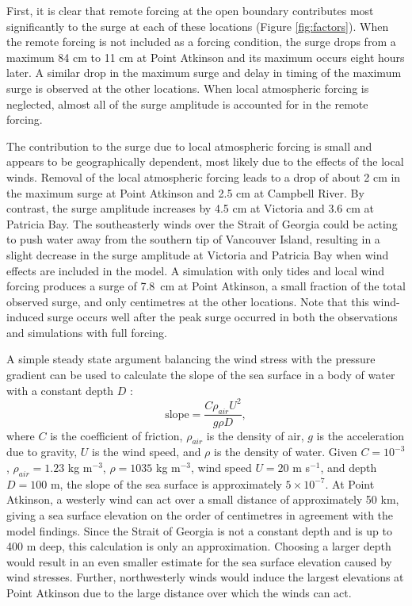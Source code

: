 \documentclass[letterpaper]{tATO2e}
\begin{document}
First, it is clear that remote forcing at the open boundary contributes most significantly to the surge at each of these locations (Figure \ref{fig:factors}). When the remote forcing is not included as a forcing condition, the surge drops from a maximum {\color{red}84 cm} to 11 cm at Point Atkinson and its maximum occurs eight hours later.  A similar drop in the maximum surge and delay in timing of the maximum surge is observed at the other locations.  When local atmospheric forcing is neglected, almost all of the surge amplitude is accounted for in the remote forcing.

The contribution to the surge due to local atmospheric forcing is small and appears to be geographically dependent, most likely due to the effects of the local winds. Removal of the local atmospheric forcing leads to a drop of about {\color{red}2 cm} in the maximum surge at Point Atkinson and {\color{red}2.5 cm} at Campbell River. By contrast, the surge amplitude increases by {\color{red} 4.5 cm} at Victoria and 3.6 cm at Patricia Bay. The southeasterly winds over the Strait of Georgia could be acting to push water away from the southern tip of Vancouver Island, resulting in a slight decrease in the surge amplitude at Victoria and Patricia Bay when wind effects are included in the model. A simulation with only tides and local wind forcing produces a surge of 7.8~cm at Point Atkinson, a small fraction of the total observed surge, and only centimetres at the other locations.  Note that this wind-induced surge occurs well after the peak surge occurred in both the observations and simulations with full forcing.

A simple steady state argument balancing the wind stress with the pressure gradient can be used to calculate the slope of the sea surface in a body of water with a constant depth $D$ \citep{pugh2004changing}: 
\begin{equation}
\text{slope} = \frac{C\rho_{air}U^2}{g\rho D},
\end{equation}
where $C$ is the coefficient of friction, $\rho_{air}$ is the density of air, $g$ is the acceleration due to gravity, $U$ is the wind speed, and $\rho$ is the density of water. Given  $C=10^{-3}$, $\rho_{air}=1.23$ kg m$^{-3}$, $\rho= 1035$  kg m$^{-3}$, wind speed $U=20$ m s$^{-1}$, and depth $D=100$ m, the slope of the sea surface is approximately $5\times10^{-7}$. At Point Atkinson, a westerly wind can act over a small distance of approximately 50 km, giving a sea surface elevation on the order of centimetres in agreement with the model findings. Since the Strait of Georgia is not a constant depth and is up to 400 m deep, this calculation is only an approximation. Choosing a larger depth would result in an even smaller estimate for the sea surface elevation caused by wind stresses. Further, northwesterly winds would induce the largest elevations at Point Atkinson due to the large distance over which the winds can act. 
\end{document}
